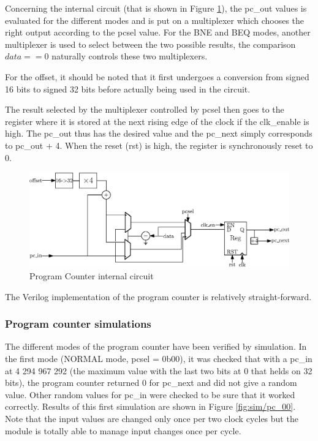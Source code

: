 Concerning the internal circuit (that is shown in Figure \ref{fig:components/pc_in}), the pc\_out 
values is evaluated for the different modes and 
is put on a multiplexer which chooses the right output according to the pcsel value. For the BNE 
and BEQ modes, another multiplexer is used to select between the two possible results, the comparison $data == 0$ naturally controls these two multiplexers. 

For the offset, it should be noted that it first undergoes a conversion from
signed 16 bits to signed 32 bits before actually being used in the circuit.

The result selected by the multiplexer controlled by pcsel then goes to the register where it is 
stored at the next rising edge of the clock if the clk\_enable is high. The 
pc\_out thus has the desired value and the pc\_next simply corresponds to pc\_out + 4. When 
the reset (rst) is high, the register is synchronously reset to 0.

\begin{figure}[H]
    \centering
    \includegraphics[width=\linewidth]{Chapter3-CPU/res/pc_internal}
    \caption{Program Counter internal circuit}
    \label{fig:components/pc_in}
\end{figure}


The Verilog implementation of the program counter is relatively straight-forward.

\subsubsection*{Program counter simulations}

The different modes of the program counter have been verified by simulation. In the first mode 
(NORMAL mode, pcsel = 0b00), it was checked that with a pc\_in at 4 294 967 292 (the maximum value with 
the last two bits at 0 that helds on 32 bits), the program counter returned 0 for pc\_next and did not 
give a random value. Other random values for pc\_in were checked to be sure that it worked 
correctly. Results of this first simulation are shown in Figure \ref{fig:sim/pc_00}. Note that the
input values are changed only once per two clock cycles but the module is totally able to manage
input changes once per cycle.

